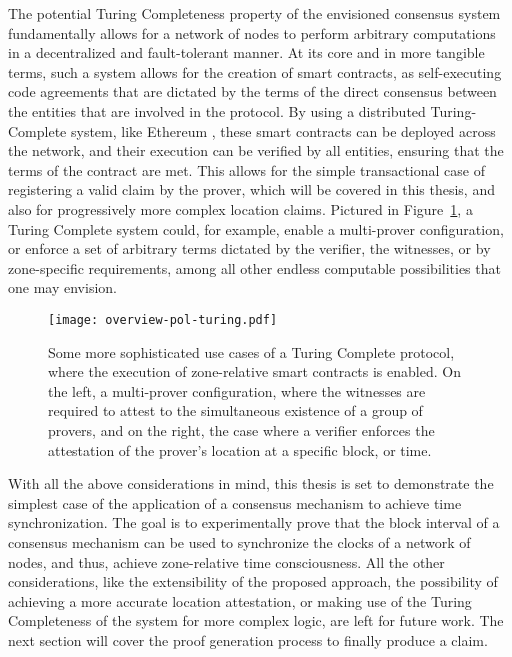 The potential Turing Completeness property of the envisioned consensus system fundamentally allows for a network of nodes to perform arbitrary computations in a decentralized and fault-tolerant manner. At its core and in more tangible terms, such a system allows for the creation of smart contracts, as self-executing code agreements that are dictated by the terms of the direct consensus between the entities that are involved in the \pol{} protocol. By using a distributed Turing-Complete system, like Ethereum \cite{buterin2014next}, these smart contracts can be deployed across the network, and their execution can be verified by all entities, ensuring that the terms of the contract are met. This allows for the simple transactional case of registering a valid \pol{} claim by the prover, which will be covered in this thesis, and also for progressively more complex location claims. Pictured in Figure~\ref{fig:proof-of-location-overview-turing}, a Turing Complete system could, for example, enable a multi-prover configuration, or enforce a set of arbitrary terms dictated by the verifier, the witnesses, or by zone-specific requirements, among all other endless computable possibilities that one may envision. 

\begin{figure}[h!]
    \begin{center}
    \texttt{[image: overview-pol-turing.pdf]}
    \caption{Some more sophisticated use cases of a Turing Complete \pol{} protocol, where the execution of zone-relative smart contracts is enabled. On the left, a multi-prover configuration, where the witnesses are required to attest to the simultaneous existence of a group of provers, and on the right, the case where a verifier enforces the attestation of the prover's location at a specific block, or time.}
    \label{fig:proof-of-location-overview-turing}
    \end{center}
\end{figure}

With all the above considerations in mind, this thesis is set to demonstrate the simplest case of the application of a consensus mechanism to achieve time synchronization. The goal is to experimentally prove that the block interval of a consensus mechanism can be used to synchronize  the clocks of a network of nodes, and thus, achieve zone-relative time consciousness. All the other considerations, like the extensibility of the proposed approach, the possibility of achieving a more accurate location attestation, or making use of the Turing Completeness of the system for more complex logic, are left for future work. The next section will cover the proof generation process to finally produce a \pol{} claim.